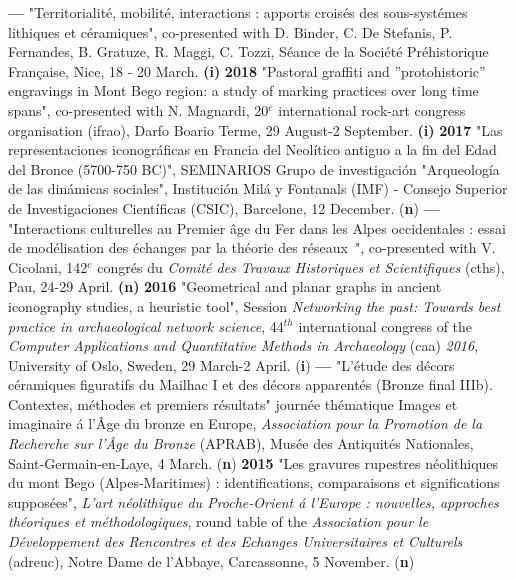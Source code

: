 \documentclass{article}
\begin{document}
\smallbreak
\textbf{---  }"Territorialit\'{e}, mobilit\'{e}, interactions : apports crois\'{e}s des sous-syst\'{e}mes lithiques et c\'{e}ramiques", co-presented with D. Binder, C. De Stefanis, P. Fernandes, B. Gratuze, R. Maggi, C. Tozzi, S\'{e}ance de la Soci\'{e}t\'{e} Pr\'{e}historique Fran\c{c}aise, Nice, 18 - 20 March.\textbf{ (i)}
\smallbreak
\textbf{2018 }"Pastoral graffiti and ''protohistoric'' engravings in Mont Bego region: a study of marking practices over long time spans", co-presented with N. Magnardi, 20${}^{e}$ international rock-art congress organisation (ifrao), Darfo Boario Terme, 29 August-2 September.\textbf{ (i)}
\smallbreak
\textbf{2017 }"Las representaciones iconogr\'{a}ficas en Francia del Neol\'{i}tico antiguo a la fin del Edad del Bronce (5700-750 BC)", SEMINARIOS Grupo de investigaci\'{o}n "Arqueolog\'{i}a de las din\'{a}micas sociales", Instituci\'{o}n Mil\'{a} y Fontanals (IMF) - Consejo Superior de Investigaciones Cient\'{i}ficas (CSIC), Barcelone, 12 December. (\textbf{n})
\smallbreak
\textbf{---  } "Interactions culturelles au Premier \^{a}ge du Fer dans les Alpes occidentales : essai de mod\'{e}lisation des \'{e}changes par la th\'{e}orie des r\'{e}seaux~", co-presented with V. Cicolani, 142${}^{e}$ congr\'{e}s du \textit{Comit\'{e} des Travaux Historiques et Scientifiques} (cths), Pau, 24-29 April.\textbf{ (n)}
\smallbreak
\textbf{2016 }"Geometrical and planar graphs in ancient iconography studies, a heuristic tool", Session \textit{Networking the past: Towards best practice in archaeological network science}, 44${}^{th}$ international congress of the \textit{Computer Applications and Quantitative Methods in Archaeology }(caa) \textit{2016}, University of Oslo, Sweden, 29 March-2 April. (\textbf{i})\textbf{}
\smallbreak
\textbf{---  }"L'\'{e}tude des d\'{e}cors c\'{e}ramiques figuratifs du Mailhac I et des d\'{e}cors apparent\'{e}s (Bronze final IIIb). Contextes, m\'{e}thodes et premiers r\'{e}sultats" journ\'{e}e th\'{e}matique Images et imaginaire \'{a} l'\^{A}ge du bronze en Europe, \textit{Association pour la Promotion de la Recherche sur l'\^{A}ge du Bronze} (APRAB), Mus\'{e}e des Antiquit\'{e}s Nationales, Saint-Germain-en-Laye, 4 March. (\textbf{n})
\smallbreak
\textbf{2015 }"Les gravures rupestres n\'{e}olithiques du mont Bego (Alpes-Maritimes) : identifications, comparaisons et significations suppos\'{e}es", \textit{L'art n\'{e}olithique du Proche-Orient \'{a} l'Europe : nouvelles, approches th\'{e}oriques et m\'{e}thodologiques}, round table of the \textit{Association pour le D\'{e}veloppement des Rencontres et des Echanges Universitaires et Culturels} (adreuc), Notre Dame de l'Abbaye, Carcassonne, 5 November. (\textbf{n})
\end{document}
